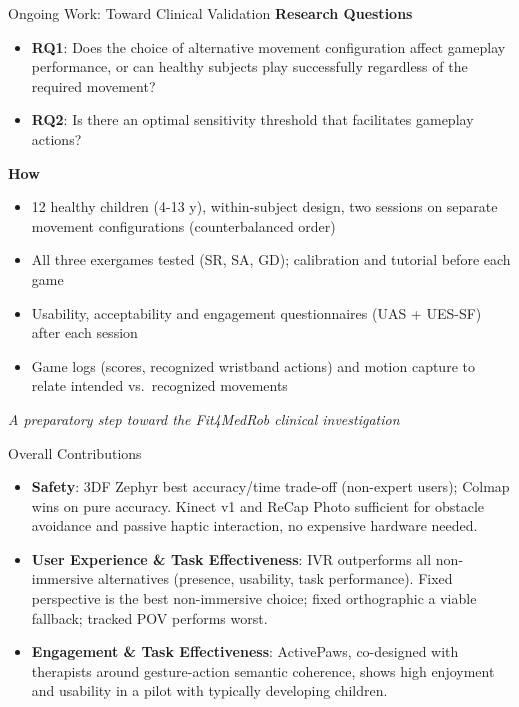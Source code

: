 \documentclass[aspectratio=169, 12pt]{beamer}
\begin{document}
\begin{frame}{Ongoing Work: Toward Clinical Validation}
	\textbf{\textcolor{gbAqua}{Research Questions}}
	
	\begin{itemize}
		\item \textbf{RQ1}: Does the choice of alternative movement configuration affect gameplay performance, or can healthy subjects play successfully regardless of the required movement?
		\item \textbf{RQ2}: Is there an optimal sensitivity threshold that facilitates gameplay actions?
	\end{itemize}
	
	\vspace{0.1cm}
	
	\textbf{\textcolor{gbAqua}{How}}
	
	\begin{itemize}
		\item 12 healthy children (4-13 y), within-subject design, two sessions on separate movement configurations (counterbalanced order)
		\item All three exergames tested (SR, SA, GD); calibration and tutorial before each game
		\item Usability, acceptability and engagement questionnaires (UAS + UES-SF) after each session
		\item Game logs (scores, recognized wristband actions) and motion capture to relate intended vs.\ recognized movements
	\end{itemize}
	
	\vspace{0.2cm}
	
	\centering
	\textit{A preparatory step toward the Fit4MedRob clinical investigation}
\end{frame}

\begin{frame}{Overall Contributions}
\begin{itemize}
    \item \textbf{Safety}: 3DF Zephyr best accuracy/time trade-off (non-expert users); Colmap wins on pure accuracy. Kinect v1 and ReCap Photo sufficient for obstacle avoidance and passive haptic interaction, no expensive hardware needed.
    \item \textbf{User Experience \& Task Effectiveness}: IVR outperforms all non-immersive alternatives (presence, usability, task performance). Fixed perspective is the best non-immersive choice; fixed orthographic a viable fallback; tracked POV performs worst.
    \item \textbf{Engagement \& Task Effectiveness}: ActivePaws, co-designed with therapists around gesture-action semantic coherence, shows high enjoyment and usability in a pilot with typically developing children.
   \end{itemize}
\end{frame}
\end{document}
